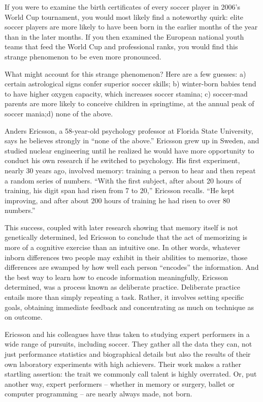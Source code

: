 If you were to examine the birth certificates of every soccer player in 2006's World Cup tournament, you would most likely find a noteworthy quirk: elite soccer players are more likely to have been born in the earlier months of the year than in the later months. If you then examined the European national youth teams that feed the World Cup and professional ranks, you would find this strange phenomenon to be even more pronounced.


What might account for this strange phenomenon? Here are a few guesses: a) certain astrological signs confer superior soccer skills; b) winter-born babies tend to have higher oxygen capacity, which increases soccer stamina; c) soccer-mad parents are more likely to conceive children in springtime, at the annual peak of soccer mania;d) none of the above.


Anders Ericsson, a 58-year-old psychology professor at Florida State University, says he believes strongly in ``none of the above.'' Ericsson grew up in Sweden, and studied nuclear engineering until he realized he would have more opportunity to conduct his own research if he switched to psychology. His first experiment, nearly 30 years ago, involved memory: training a person to hear and then repeat a random series of numbers. ``With the first subject, after about 20 hours of training, his digit span had risen from 7 to 20,'' Ericsson recalls. ``He kept improving, and after about 200 hours of training he had risen to over 80 numbers.''


This success, coupled with later research showing that memory itself is not genetically determined, led Ericsson to conclude that the act of memorizing is more of a cognitive exercise than an intuitive one. In other words, whatever inborn differences two people may exhibit in their abilities to memorize, those differences are swamped by how well each person ``encodes'' the information. And the best way to learn how to encode information meaningfully, Ericsson determined, was a process known as deliberate practice. Deliberate practice entails more than simply repeating a task. Rather, it involves setting specific goals, obtaining immediate feedback and concentrating as much on technique as on outcome.


Ericsson and his colleagues have thus taken to studying expert performers in a wide range of pursuits, including soccer. They gather all the data they can, not just performance statistics and biographical details but also the results of their own laboratory experiments with high achievers. Their work makes a rather startling assertion: the trait we commonly call talent is highly overrated. Or, put another way, expert performers – whether in memory or surgery, ballet or computer programming – are nearly always made, not born.